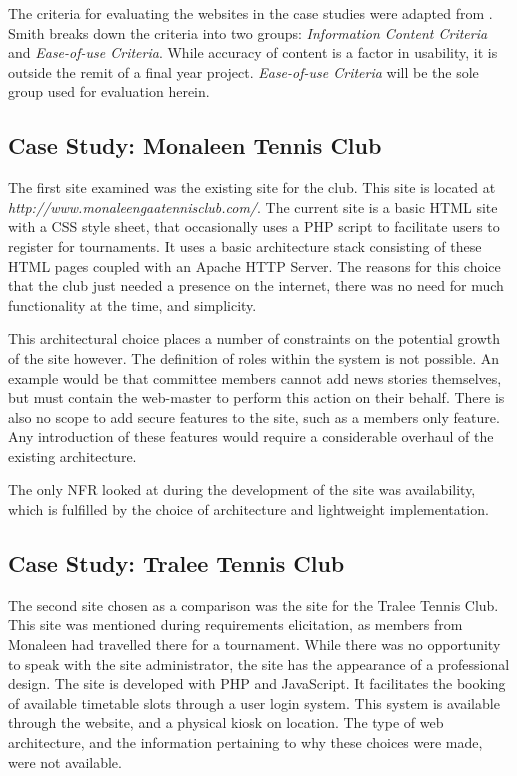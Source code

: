 The criteria for evaluating the websites in the case studies were adapted from \cite{smith2001applying}. Smith breaks down the criteria into two groups: \textit{Information Content Criteria} and \textit{Ease-of-use Criteria}. While accuracy of content is a factor in usability, it is outside the remit of a final year project. \textit{Ease-of-use Criteria} will be the sole group used for evaluation herein. 


\subsection{Case Study: Monaleen Tennis Club}

The first site examined was the existing site for the club. This site is located at \newline\textit{http://www.monaleengaatennisclub.com/}. The current site is a basic HTML site with a CSS style sheet, that occasionally uses a PHP script to facilitate users to register for tournaments. It uses a basic architecture stack consisting of these HTML pages coupled with an Apache HTTP Server. The reasons for this choice that the club just needed a presence on the internet, there was no need for much functionality at the time, and simplicity.

This architectural choice places a number of constraints on the potential growth of the site however. The definition of roles within the system is not possible. An example would be that committee members cannot add news stories themselves, but must contain the web-master to perform this action on their behalf. There is also no scope to add secure features to the site, such as a members only feature. Any introduction of these features would require a considerable overhaul of the existing architecture.

The only NFR looked at during the development of the site was availability, which is fulfilled by the choice of architecture and lightweight implementation. 

\subsection{Case Study: Tralee Tennis Club}

The second site chosen as a comparison was the site for the Tralee Tennis Club. This site was mentioned during requirements elicitation, as members from Monaleen had travelled there for a tournament. While there was no opportunity to speak with the site administrator, the site has the appearance of a professional design. The site is developed with PHP and JavaScript. It facilitates the booking of available timetable slots through a user login system. This system is available through the website, and a physical kiosk on location. The type of web architecture, and the information pertaining to why these choices were made, were not available.  

